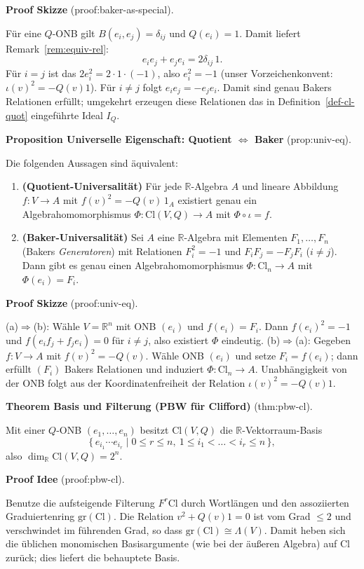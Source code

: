 \documentclass[10pt, letterpaper]{article}
\newcommand{\R}{\mathbb{R}}
\newcommand{\Cl}{\mathrm{Cl}}
\newcommand{\CustomHeading}[3]{%
  \par\medskip\noindent%
  \textbf{#1 #2} \textnormal{(#3)}.\enskip%
}
\newenvironment{PROP}[2]{\begin{unitbox}\CustomHeading{Proposition}{#1}{#2}}{\end{unitbox}}
\newenvironment{THEO}[2]{\begin{unitbox}\CustomHeading{Theorem}{#1}{#2}}{\end{unitbox}}
\newenvironment{PROOF}[2]{\begin{unitbox}\CustomHeading{Proof}{#1}{#2}}{\end{unitbox}}
\begin{document}
\begin{PROOF}{Skizze}{proof:baker-as-special}
Für eine $Q$-ONB gilt $B(e_i,e_j)=\delta_{ij}$ und $Q(e_i)=1$.
Damit liefert Remark~\ref{rem:equiv-rel}:
\[
e_ie_j+e_je_i=2\delta_{ij}\,1.
\]
Für $i=j$ ist das $2e_i^2=2\cdot 1\cdot(-1)$, also $e_i^2=-1$ (unser Vorzeichenkonvent:
$\iota(v)^2=-Q(v)1$). Für $i\ne j$ folgt $e_ie_j=-e_je_i$.
Damit sind genau Bakers Relationen erfüllt; umgekehrt erzeugen diese Relationen
das in Definition~\ref{def-cl-quot} eingeführte Ideal $I_Q$.
\end{PROOF}

\begin{PROP}{Universelle Eigenschaft: Quotient $\Longleftrightarrow$ Baker}{prop:univ-eq}
Die folgenden Aussagen sind äquivalent:
\begin{enumerate}[label=(\alph*), leftmargin=*]
\item \textbf{(Quotient-Universalität)} Für jede $\R$-Algebra $A$ und lineare Abbildung
$f:V\to A$ mit $f(v)^2=-Q(v)\,1_A$ existiert genau ein Algebrahomomorphismus
$\Phi:\Cl(V,Q)\to A$ mit $\Phi\circ\iota=f$.
\item \textbf{(Baker-Universalität)} Sei $A$ eine $\R$-Algebra mit Elementen
$F_1,\dots,F_n$ (Bakers \emph{Generatoren}) mit Relationen
$F_i^2=-1$ und $F_iF_j=-F_jF_i$ ($i\ne j$). Dann gibt es genau einen
Algebrahomomorphismus $\Phi:\Cl_n\to A$ mit $\Phi(e_i)=F_i$.
\end{enumerate}
\end{PROP}

\begin{PROOF}{Skizze}{proof:univ-eq}
(a)$\Rightarrow$(b): Wähle $V=\R^n$ mit ONB $(e_i)$ und $f(e_i)=F_i$.
Dann $f(e_i)^2=-1$ und $f(e_if_j+f_je_i)=0$ für $i\ne j$,
also existiert $\Phi$ eindeutig.
(b)$\Rightarrow$(a): Gegeben $f:V\to A$ mit $f(v)^2=-Q(v)$.
Wähle ONB $(e_i)$ und setze $F_i=f(e_i)$; dann erfüllt $(F_i)$ Bakers Relationen
und induziert $\Phi:\Cl_n\to A$. Unabhängigkeit von der ONB folgt aus der
Koordinatenfreiheit der Relation $\iota(v)^2=-Q(v)1$.
\end{PROOF}

\begin{THEO}{Basis und Filterung (PBW für Clifford)}{thm:pbw-cl}
Mit einer $Q$-ONB $(e_1,\dots,e_n)$ besitzt $\Cl(V,Q)$ die
$\R$-Vektorraum-Basis
\[
\{\,e_{i_1}\cdots e_{i_r}\mid 0\le r\le n,\ 1\le i_1<\dots<i_r\le n\,\},
\]
also $\dim_\R\Cl(V,Q)=2^n$.
\end{THEO}

\begin{PROOF}{Idee}{proof:pbw-cl}
Benutze die aufsteigende Filterung $F^r\Cl$ durch Wortlängen und den
assoziierten Graduiertenring $\mathrm{gr}(\Cl)$. Die Relation
$v^2+Q(v)1=0$ ist vom Grad $\le2$ und verschwindet im führenden Grad,
so dass $\mathrm{gr}(\Cl)\cong\Lambda(V)$. Damit heben sich
die üblichen monomischen Basisargumente (wie bei der äußeren Algebra)
auf $\Cl$ zurück; dies liefert die behauptete Basis.
\end{PROOF}
\end{document}
